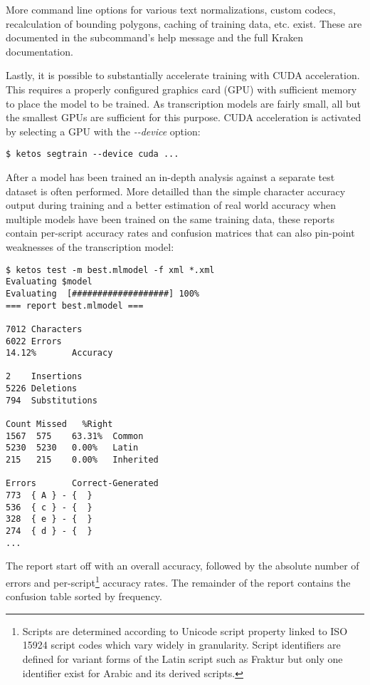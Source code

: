 More command line options for various text normalizations, custom codecs,
recalculation of bounding polygons, caching of training data, etc. exist. These
are documented in the subcommand's help message and the full Kraken
documentation.

Lastly, it is possible to substantially accelerate training with CUDA
acceleration. This requires a properly configured graphics card (GPU) with
sufficient memory to place the model to be trained. As transcription models are
fairly small, all but the smallest GPUs are sufficient for this purpose. CUDA
acceleration is activated by selecting a GPU with the \emph{-{}-device} option:

\begin{verbatim}
$ ketos segtrain --device cuda ...
\end{verbatim}

After a model has been trained an in-depth analysis against a separate test
dataset is often performed. More detailled than the simple character accuracy
output during training and a better estimation of real world accuracy when
multiple models have been trained on the same training data, these reports
contain per-script accuracy rates and confusion matrices that can also
pin-point weaknesses of the transcription model:

\begin{verbatim}
$ ketos test -m best.mlmodel -f xml *.xml
Evaluating $model
Evaluating  [###################] 100%
=== report best.mlmodel ===

7012 Characters
6022 Errors
14.12%       Accuracy

2    Insertions
5226 Deletions 
794  Substitutions

Count Missed   %Right
1567  575    63.31%  Common
5230  5230   0.00%   Latin
215   215    0.00%   Inherited

Errors       Correct-Generated
773  { A } - {  }
536  { c } - {  }
328  { e } - {  }
274  { d } - {  }
...
\end{verbatim}

The report start off with an overall accuracy, followed by the absolute number
of errors and per-script\footnote{Scripts are determined according to Unicode
script property linked to ISO 15924 script codes which vary widely in
granularity. Script identifiers are defined for variant forms of the Latin
script such as Fraktur but only one identifier exist for Arabic and its derived
scripts.} accuracy rates. The remainder of the report contains the confusion
table sorted by frequency.

